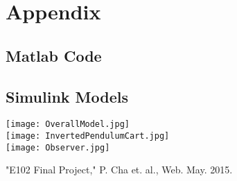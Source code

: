 \documentclass[12pt]{article}
\begin{document}
\newpage
\section{Appendix}
\subsection{Matlab Code}


\subsection{Simulink Models}
\texttt{[image: OverallModel.jpg]} \\
\texttt{[image: InvertedPendulumCart.jpg]} \\
\texttt{[image: Observer.jpg]} 
\vfill

\begin{thebibliography}{widest entry}

 \label{E102} "E102 Final Project," P. Cha et. al., Web. May. 2015.

\end{thebibliography}

\vfill
\end{document}
